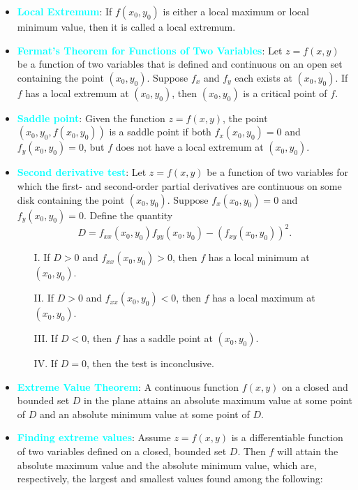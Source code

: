 \documentclass{report}
\begin{document}
\begin{itemize}
    \item \textbf{\textcolor{cyan}{Local Extremum}}:
        If $f(x_0, y_0)$ is either a local maximum or local minimum value, then it is called a local extremum.
    \item \textbf{\textcolor{cyan}{Fermat’s Theorem for Functions of Two Variables}}: 
        Let $z = f(x, y)$ be a function of two variables that is defined and continuous on an open set containing the point $(x_0, y_0)$. Suppose $f_x$ and $f_y$ each exists at $(x_0, y_0)$. If $f$ has a local extremum at $(x_0, y_0)$, then $(x_0, y_0)$ is a critical point of $f$.
    \item \textbf{\textcolor{cyan}{Saddle point}}: Given the function $z = f(x, y)$, the point $(x_0, y_0, f(x_0, y_0))$ is a saddle point if both $f_x(x_0, y_0) = 0$ and $f_y(x_0, y_0) = 0$, but $f$ does not have a local extremum at $(x_0, y_0)$.
    \item \textbf{\textcolor{cyan}{Second derivative test}}:
        Let $z = f(x, y)$ be a function of two variables for which the first- and second-order partial derivatives are continuous on some disk containing the point $(x_0, y_0)$. Suppose $f_x(x_0, y_0) = 0$ and $f_y(x_0, y_0) = 0$. Define the quantity
        \[ D = f_{xx}(x_0, y_0)f_{yy}(x_0, y_0) - (f_{xy}(x_0, y_0))^2. \]
        \begin{enumerate}
            \item[I.] If $D > 0$ and $f_{xx}(x_0, y_0) > 0$, then $f$ has a local minimum at $(x_0, y_0)$.
            \item[II.] If $D > 0$ and $f_{xx}(x_0, y_0) < 0$, then $f$ has a local maximum at $(x_0, y_0)$.
            \item[III.] If $D < 0$, then $f$ has a saddle point at $(x_0, y_0)$.
            \item[IV.] If $D = 0$, then the test is inconclusive.
        \end{enumerate}
        \bigbreak \noindent 
    \item \textbf{\textcolor{cyan}{Extreme Value Theorem}}:
        A continuous function $f(x,y)$ on a closed and bounded set $D$ in the plane attains an absolute maximum value at some point of $D$ and an absolute minimum value at some point of $D$.
    \item \textbf{\textcolor{cyan}{Finding extreme values}}:
        Assume $z=f(x,y)$ is a differentiable function of two variables defined on a closed, bounded set $D$. Then $f$ will attain the absolute maximum value and the absolute minimum value, which are, respectively, the largest and smallest values found among the following:

\end{itemize}
\end{document}

